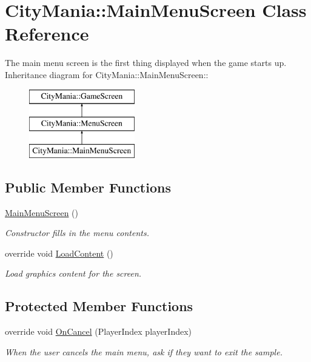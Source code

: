 \hypertarget{classCityMania_1_1MainMenuScreen}{
\section{CityMania::MainMenuScreen Class Reference}
\label{classCityMania_1_1MainMenuScreen}
}


The main menu screen is the first thing displayed when the game starts up.  
Inheritance diagram for CityMania::MainMenuScreen::\begin{figure}[H]
\begin{center}
\leavevmode
\includegraphics[height=3cm]{classCityMania_1_1MainMenuScreen}
\end{center}
\end{figure}
\subsection*{Public Member Functions}
\begin{DoxyCompactItemize}
\item 
\hyperlink{classCityMania_1_1MainMenuScreen_a8716594ac7a9fc44ee0b88c57e24674b}{MainMenuScreen} ()
\begin{DoxyCompactList}\small\item\em Constructor fills in the menu contents. \item\end{DoxyCompactList}\item 
override void \hyperlink{classCityMania_1_1MainMenuScreen_a784682ea2036cdefdbbf8ea642f70be0}{LoadContent} ()
\begin{DoxyCompactList}\small\item\em Load graphics content for the screen. \item\end{DoxyCompactList}\end{DoxyCompactItemize}
\subsection*{Protected Member Functions}
\begin{DoxyCompactItemize}
\item 
override void \hyperlink{classCityMania_1_1MainMenuScreen_a46244ba46d101dafbdad93e8a8cb00a2}{OnCancel} (PlayerIndex playerIndex)
\begin{DoxyCompactList}\small\item\em When the user cancels the main menu, ask if they want to exit the sample. \item\end{DoxyCompactList}\end{DoxyCompactItemize}



